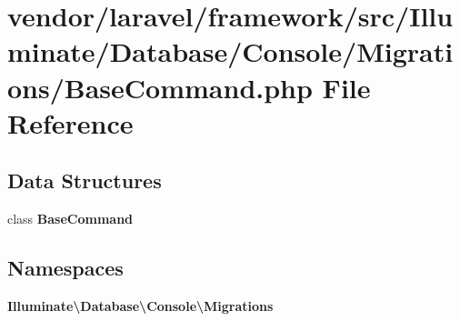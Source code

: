 \section{vendor/laravel/framework/src/\+Illuminate/\+Database/\+Console/\+Migrations/\+Base\+Command.php File Reference}
\label{_base_command_8php}
\subsection*{Data Structures}
\begin{DoxyCompactItemize}
\item 
class {\bf Base\+Command}
\end{DoxyCompactItemize}
\subsection*{Namespaces}
\begin{DoxyCompactItemize}
\item 
 {\bf Illuminate\textbackslash{}\+Database\textbackslash{}\+Console\textbackslash{}\+Migrations}
\end{DoxyCompactItemize}
